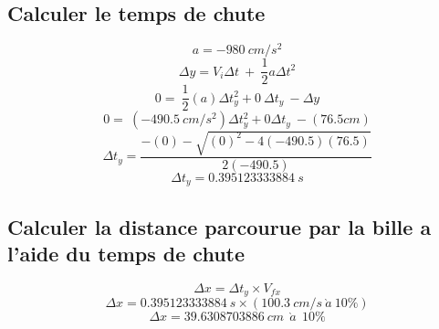 \documentclass{article}
\begin{document}
            \subsection{Calculer le temps de chute}
                \setcounter{equation}{0}
                \vspace{5mm}
                \vspace{5mm}
                \begin{equation}
                    a = -980 \ cm/s^2
                \end{equation}
                \vspace{5mm}
                \begin{equation}
                    \Delta y = V_i \Delta t \ + \ \frac{1}{2} a \Delta t ^2
                \end{equation}
               \vspace{5mm}
                \begin{equation}
                    0 = \ \frac{1}{2}(a) \Delta t_y ^2 + 0 \ \Delta t_y \  - \Delta y
                \end{equation}
                \vspace{5mm}
                \begin{equation}
                    0 = \ (-490.5 \ cm/s^2) \Delta t_y ^2 + 0\Delta t_y \  - (76.5cm)
                \end{equation}
                \vspace{5mm}
                \begin{equation}
                    \Delta t_y = \frac{-(0)-\sqrt{(0)^2 - 4(-490.5)(76.5)}}{2(-490.5)}
                \end{equation}
                \vspace{5mm}
                \begin{equation}
                    \Delta t_y = 0.395123333884 \ s
                \end{equation}
                \vspace{5mm}
            \subsection{Calculer la distance parcourue par la bille a l'aide du temps de chute}
                 \setcounter{equation}{0}
                \vspace{5mm}
                \begin{equation}
                    \Delta x = \Delta t_y \times V_{fx}
                \end{equation}
                \vspace{5mm}
                \begin{equation}
                    \Delta x = 0.395123333884 \ s \times ( 100.3 \ cm/s \ \grave{a} \ 10 \%)
                \end{equation}
                \vspace{5mm}
                \begin{equation}
                    \Delta x = 39.6308703886 \ cm \ \ \grave{a} \ \ 10 \%
                \end{equation}
                \newpage
\end{document}
